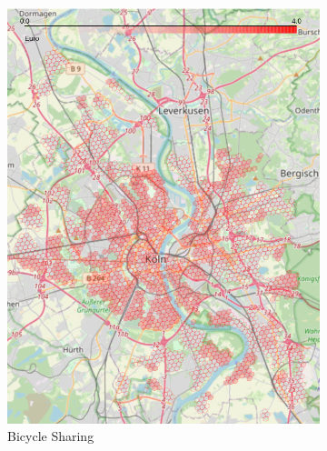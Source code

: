 \begin{figure}
\begin{subfigure}[b]{0.3\textwidth}
         \includegraphics[width=\textwidth]{Figures/results/cost/bicycle_cost_map}
         \caption{Bicycle Sharing}
         \label{fig:bicycle_cost_map}
     \end{subfigure}
     \hfill
     \begin{subfigure}[b]{0.3\textwidth}
         \centering

\end{subfigure}
\end{figure}
